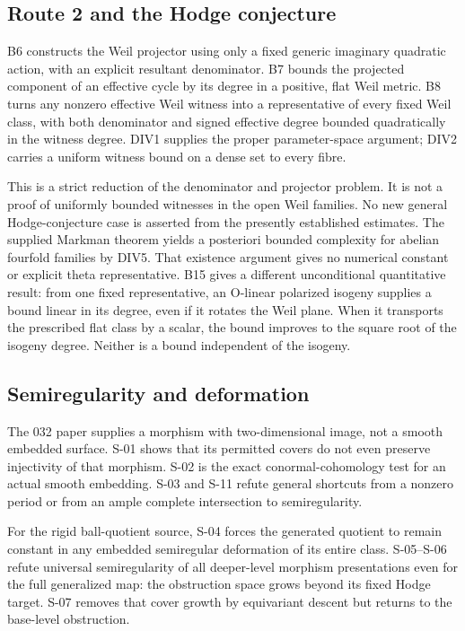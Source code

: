 \documentclass[11pt,a4paper]{article}
\theoremstyle{definition}
\begin{document}
\subsection{Route 2 and the Hodge
conjecture}\label{route-2-and-the-hodge-conjecture}

B6 constructs the Weil projector using only a fixed generic imaginary
quadratic action, with an explicit resultant denominator. B7 bounds the
projected component of an effective cycle by its degree in a positive,
flat Weil metric. B8 turns any nonzero effective Weil witness into a
representative of every fixed Weil class, with both denominator and
signed effective degree bounded quadratically in the witness degree.
DIV1 supplies the proper parameter-space argument; DIV2 carries a
uniform witness bound on a dense set to every fibre.

This is a strict reduction of the denominator and projector problem. It
is not a proof of uniformly bounded witnesses in the open Weil families.
No new general Hodge-conjecture case is asserted from the presently
established estimates. The supplied Markman theorem yields a posteriori
bounded complexity for abelian fourfold families by DIV5. That existence
argument gives no numerical constant or explicit theta representative.
B15 gives a different unconditional quantitative result: from one fixed
representative, an O-linear polarized isogeny supplies a bound linear in
its degree, even if it rotates the Weil plane. When it transports the
prescribed flat class by a scalar, the bound improves to the square root
of the isogeny degree. Neither is a bound independent of the isogeny.

\subsection{Semiregularity and
deformation}\label{semiregularity-and-deformation}

The 032 paper supplies a morphism with two-dimensional image, not a
smooth embedded surface. S-01 shows that its permitted covers do not
even preserve injectivity of that morphism. S-02 is the exact
conormal-cohomology test for an actual smooth embedding. S-03 and S-11
refute general shortcuts from a nonzero period or from an ample complete
intersection to semiregularity.

For the rigid ball-quotient source, S-04 forces the generated quotient
to remain constant in any embedded semiregular deformation of its entire
class. S-05--S-06 refute universal semiregularity of all deeper-level
morphism presentations even for the full generalized map: the
obstruction space grows beyond its fixed Hodge target. S-07 removes that
cover growth by equivariant descent but returns to the base-level
obstruction.
\end{document}
